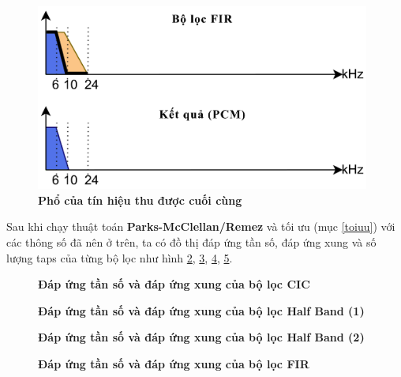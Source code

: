 \begin{figure}[H]
    \centering
    \includegraphics[width=11cm]{Images/Chuong3/4.png}
    \caption[Phổ của tín hiệu thu được cuối cùng]{\bfseries \fontsize{12pt}{0pt}\selectfont Phổ của tín hiệu thu được cuối cùng}
    \label{t4}
\end{figure}

Sau khi chạy thuật toán \textbf{Parks-McClellan/Remez} và tối ưu (mục \ref{toiuu}) với các thông số đã nên ở trên, ta có đồ thị đáp ứng tần số, đáp ứng xung và số lượng taps của từng bộ lọc như hình \ref{a}, \ref{b}, \ref{c}, \ref{d}.  
\vspace{1.5cm}
\begin{figure}[H]
    \centering
    
    \caption[Đáp ứng tần số và đáp ứng xung của bộ lọc CIC]{\bfseries \fontsize{12pt}{0pt}\selectfont Đáp ứng tần số và đáp ứng xung của bộ lọc CIC}
    \label{a}
\end{figure}
\vspace{1.5cm}
\begin{figure}[H]
    \centering
    
    \caption[Đáp ứng tần số và đáp ứng xung của bộ lọc Half Band (1)]{\bfseries \fontsize{12pt}{0pt}\selectfont Đáp ứng tần số và đáp ứng xung của bộ lọc Half Band (1)}
    \label{b}
\end{figure}
\vspace{1.5cm}
\begin{figure}[H]
    \centering
    
    \caption[Đáp ứng tần số và đáp ứng xung của bộ lọc Half Band (2)]{\bfseries \fontsize{12pt}{0pt}\selectfont Đáp ứng tần số và đáp ứng xung của bộ lọc Half Band (2)}
    \label{c}
\end{figure}
\begin{figure}[H]
    \centering
    
    \caption[Đáp ứng tần số và đáp ứng xung của bộ lọc FIR]{\bfseries \fontsize{12pt}{0pt}\selectfont Đáp ứng tần số và đáp ứng xung của bộ lọc FIR}
    \label{d}
\end{figure}

